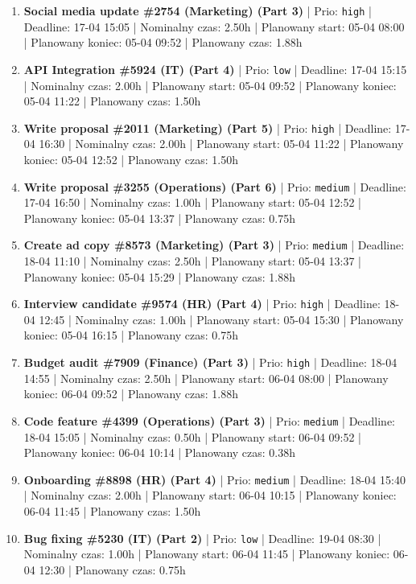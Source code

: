 {\begin{enumerate}
  \item [\textbf{14611}] \textbf{Social media update \#2754 (Marketing) (Part 3)} | Prio: \texttt{high} | Deadline: 17-04 15:05 | Nominalny czas: 2.50h | Planowany start: 05-04 08:00 | Planowany koniec: 05-04 09:52 | Planowany czas: 1.88h
  \item [\textbf{14696}] \textbf{API Integration \#5924 (IT) (Part 4)} | Prio: \texttt{low} | Deadline: 17-04 15:15 | Nominalny czas: 2.00h | Planowany start: 05-04 09:52 | Planowany koniec: 05-04 11:22 | Planowany czas: 1.50h
  \item [\textbf{14628}] \textbf{Write proposal \#2011 (Marketing) (Part 5)} | Prio: \texttt{high} | Deadline: 17-04 16:30 | Nominalny czas: 2.00h | Planowany start: 05-04 11:22 | Planowany koniec: 05-04 12:52 | Planowany czas: 1.50h
  \item [\textbf{14654}] \textbf{Write proposal \#3255 (Operations) (Part 6)} | Prio: \texttt{medium} | Deadline: 17-04 16:50 | Nominalny czas: 1.00h | Planowany start: 05-04 12:52 | Planowany koniec: 05-04 13:37 | Planowany czas: 0.75h
  \item [\textbf{14677}] \textbf{Create ad copy \#8573 (Marketing) (Part 3)} | Prio: \texttt{medium} | Deadline: 18-04 11:10 | Nominalny czas: 2.50h | Planowany start: 05-04 13:37 | Planowany koniec: 05-04 15:29 | Planowany czas: 1.88h
  \item [\textbf{14612}] \textbf{Interview candidate \#9574 (HR) (Part 4)} | Prio: \texttt{high} | Deadline: 18-04 12:45 | Nominalny czas: 1.00h | Planowany start: 05-04 15:30 | Planowany koniec: 05-04 16:15 | Planowany czas: 0.75h
  \item [\textbf{14616}] \textbf{Budget audit \#7909 (Finance) (Part 3)} | Prio: \texttt{high} | Deadline: 18-04 14:55 | Nominalny czas: 2.50h | Planowany start: 06-04 08:00 | Planowany koniec: 06-04 09:52 | Planowany czas: 1.88h
  \item [\textbf{14664}] \textbf{Code feature \#4399 (Operations) (Part 3)} | Prio: \texttt{medium} | Deadline: 18-04 15:05 | Nominalny czas: 0.50h | Planowany start: 06-04 09:52 | Planowany koniec: 06-04 10:14 | Planowany czas: 0.38h
  \item [\textbf{14636}] \textbf{Onboarding \#8898 (HR) (Part 4)} | Prio: \texttt{medium} | Deadline: 18-04 15:40 | Nominalny czas: 2.00h | Planowany start: 06-04 10:15 | Planowany koniec: 06-04 11:45 | Planowany czas: 1.50h
  \item [\textbf{14680}] \textbf{Bug fixing \#5230 (IT) (Part 2)} | Prio: \texttt{low} | Deadline: 19-04 08:30 | Nominalny czas: 1.00h | Planowany start: 06-04 11:45 | Planowany koniec: 06-04 12:30 | Planowany czas: 0.75h

\end{enumerate}}
